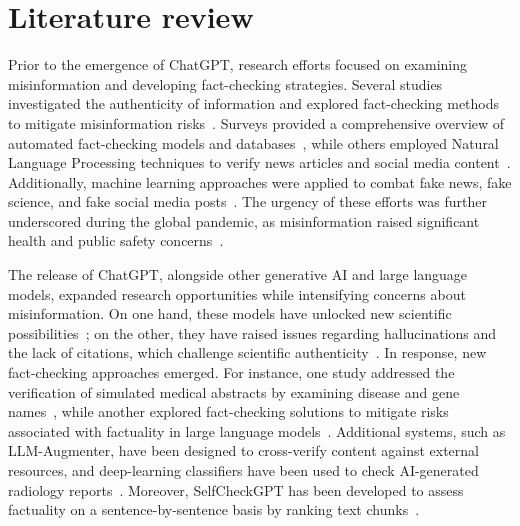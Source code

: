 \section{Literature review}
Prior to the emergence of ChatGPT, research efforts focused on examining misinformation and developing fact-checking strategies. Several studies investigated the authenticity of information and explored fact-checking methods to mitigate misinformation risks~\cite{ciampaglia2015computational,luengo2020performance,nyhan2020taking,rodriguez2021debunking}. Surveys provided a comprehensive overview of automated fact-checking models and databases~\cite{zeng2021automated,guo2022survey}, while others employed Natural Language Processing techniques to verify news articles and social media content~\cite{lazarski2021using,oshikawa2018survey}. Additionally, machine learning approaches were applied to combat fake news, fake science, and fake social media posts~\cite{anusree2022factorfake,khalil2021detecting,zhou2019physiological,vo2019learning}. The urgency of these efforts was further underscored during the global pandemic, as misinformation raised significant health and public safety concerns~\cite{krause2020fact,luengo2020performance,abdeen2021fighting,siwakoti2021covid}.

The release of ChatGPT, alongside other generative AI and large language models, expanded research opportunities while intensifying concerns about misinformation. On one hand, these models have unlocked new scientific possibilities~\cite{koohi2023generative,degrave2023dissection,trabassi2024optimizing,wang2023applications}; on the other, they have raised issues regarding hallucinations and the lack of citations, which challenge scientific authenticity~\cite{tian2024opportunities,van2024chatgpt,barreto2023generative,giannakos2024promise}. In response, new fact-checking approaches emerged. For instance, one study addressed the verification of simulated medical abstracts by examining disease and gene names~\cite{Hamed_FC2004}, while another explored fact-checking solutions to mitigate risks associated with factuality in large language models~\cite{augenstein2024factuality}. Additional systems, such as LLM-Augmenter, have been designed to cross-verify content against external resources, and deep-learning classifiers have been used to check AI-generated radiology reports~\cite{peng2023check,mahmood2023fact}. Moreover, SelfCheckGPT has been developed to assess factuality on a sentence-by-sentence basis by ranking text chunks~\cite{manakul2023selfcheckgpt}.

